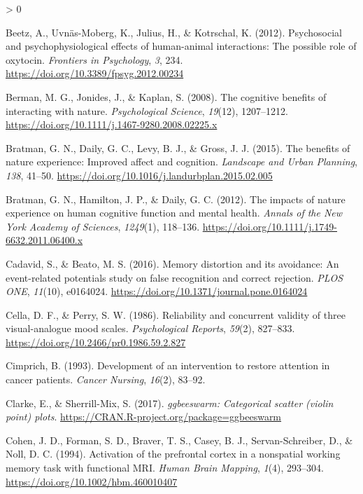\documentclass[
  english,
  pub,floatsintext]{apa6}
\newlength{\cslhangindent}
\newenvironment{CSLReferences}[2] %
 {%
  \setlength{\parindent}{0pt}
  \ifodd #1 \everypar{\setlength{\hangindent}{\cslhangindent}}\ignorespaces\fi
  \ifnum #2 > 0
  \setlength{\parskip}{#2\baselineskip}
  \fi
 }%
 {}
\begin{document}
\begin{CSLReferences}{1}{0}
\leavevmode\hypertarget{ref-Beetz.etal.2012}{}%
Beetz, A., Uvnäs-Moberg, K., Julius, H., \& Kotrschal, K. (2012). Psychosocial and psychophysiological effects of human-animal interactions: {The} possible role of oxytocin. \emph{Frontiers in Psychology}, \emph{3}, 234. \url{https://doi.org/10.3389/fpsyg.2012.00234}

\leavevmode\hypertarget{ref-Berman.etal.2008}{}%
Berman, M. G., Jonides, J., \& Kaplan, S. (2008). The cognitive benefits of interacting with nature. \emph{Psychological Science}, \emph{19}(12), 1207--1212. \url{https://doi.org/10.1111/j.1467-9280.2008.02225.x}

\leavevmode\hypertarget{ref-Bratman.etal.2015}{}%
Bratman, G. N., Daily, G. C., Levy, B. J., \& Gross, J. J. (2015). The benefits of nature experience: {Improved} affect and cognition. \emph{Landscape and Urban Planning}, \emph{138}, 41--50. \url{https://doi.org/10.1016/j.landurbplan.2015.02.005}

\leavevmode\hypertarget{ref-Bratman.etal.2012}{}%
Bratman, G. N., Hamilton, J. P., \& Daily, G. C. (2012). The impacts of nature experience on human cognitive function and mental health. \emph{Annals of the New York Academy of Sciences}, \emph{1249}(1), 118--136. \url{https://doi.org/10.1111/j.1749-6632.2011.06400.x}

\leavevmode\hypertarget{ref-Cadavid.Beato.2016}{}%
Cadavid, S., \& Beato, M. S. (2016). Memory distortion and its avoidance: {An} event-related potentials study on false recognition and correct rejection. \emph{PLOS ONE}, \emph{11}(10), e0164024. \url{https://doi.org/10.1371/journal.pone.0164024}

\leavevmode\hypertarget{ref-Cella.Perry.1986}{}%
Cella, D. F., \& Perry, S. W. (1986). Reliability and concurrent validity of three visual-analogue mood scales. \emph{Psychological Reports}, \emph{59}(2), 827--833. \url{https://doi.org/10.2466/pr0.1986.59.2.827}

\leavevmode\hypertarget{ref-Cimprich.1993}{}%
Cimprich, B. (1993). Development of an intervention to restore attention in cancer patients. \emph{Cancer Nursing}, \emph{16}(2), 83--92.

\leavevmode\hypertarget{ref-R-ggbeeswarm}{}%
Clarke, E., \& Sherrill-Mix, S. (2017). \emph{{ggbeeswarm}: Categorical scatter (violin point) plots}. \url{https://CRAN.R-project.org/package=ggbeeswarm}

\leavevmode\hypertarget{ref-Cohen.etal.1994}{}%
Cohen, J. D., Forman, S. D., Braver, T. S., Casey, B. J., Servan-Schreiber, D., \& Noll, D. C. (1994). Activation of the prefrontal cortex in a nonspatial working memory task with functional {MRI}. \emph{Human Brain Mapping}, \emph{1}(4), 293--304. \url{https://doi.org/10.1002/hbm.460010407}


\end{CSLReferences}
\end{document}
